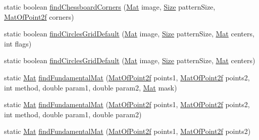 \begin{DoxyCompactItemize}
\item 
static boolean \mbox{\hyperlink{classorg_1_1opencv_1_1calib3d_1_1_calib3d_aa309372b843626fe1d7195ea65bf01ce}{find\+Chessboard\+Corners}} (\mbox{\hyperlink{classorg_1_1opencv_1_1core_1_1_mat}{Mat}} image, \mbox{\hyperlink{classorg_1_1opencv_1_1core_1_1_size}{Size}} pattern\+Size, \mbox{\hyperlink{classorg_1_1opencv_1_1core_1_1_mat_of_point2f}{Mat\+Of\+Point2f}} corners)
\item 
static boolean \mbox{\hyperlink{classorg_1_1opencv_1_1calib3d_1_1_calib3d_a1ca6a42bf6b43db65fc0f231db9d2117}{find\+Circles\+Grid\+Default}} (\mbox{\hyperlink{classorg_1_1opencv_1_1core_1_1_mat}{Mat}} image, \mbox{\hyperlink{classorg_1_1opencv_1_1core_1_1_size}{Size}} pattern\+Size, \mbox{\hyperlink{classorg_1_1opencv_1_1core_1_1_mat}{Mat}} centers, int flags)
\item 
static boolean \mbox{\hyperlink{classorg_1_1opencv_1_1calib3d_1_1_calib3d_a07ab97ed42f8f202715b367a9e31d903}{find\+Circles\+Grid\+Default}} (\mbox{\hyperlink{classorg_1_1opencv_1_1core_1_1_mat}{Mat}} image, \mbox{\hyperlink{classorg_1_1opencv_1_1core_1_1_size}{Size}} pattern\+Size, \mbox{\hyperlink{classorg_1_1opencv_1_1core_1_1_mat}{Mat}} centers)
\item 
static \mbox{\hyperlink{classorg_1_1opencv_1_1core_1_1_mat}{Mat}} \mbox{\hyperlink{classorg_1_1opencv_1_1calib3d_1_1_calib3d_a3dedba28209d17c56b4470b9cce95596}{find\+Fundamental\+Mat}} (\mbox{\hyperlink{classorg_1_1opencv_1_1core_1_1_mat_of_point2f}{Mat\+Of\+Point2f}} points1, \mbox{\hyperlink{classorg_1_1opencv_1_1core_1_1_mat_of_point2f}{Mat\+Of\+Point2f}} points2, int method, double param1, double param2, \mbox{\hyperlink{classorg_1_1opencv_1_1core_1_1_mat}{Mat}} mask)
\item 
static \mbox{\hyperlink{classorg_1_1opencv_1_1core_1_1_mat}{Mat}} \mbox{\hyperlink{classorg_1_1opencv_1_1calib3d_1_1_calib3d_ab758a6250812f65ccec0421d386be1c8}{find\+Fundamental\+Mat}} (\mbox{\hyperlink{classorg_1_1opencv_1_1core_1_1_mat_of_point2f}{Mat\+Of\+Point2f}} points1, \mbox{\hyperlink{classorg_1_1opencv_1_1core_1_1_mat_of_point2f}{Mat\+Of\+Point2f}} points2, int method, double param1, double param2)
\item 
static \mbox{\hyperlink{classorg_1_1opencv_1_1core_1_1_mat}{Mat}} \mbox{\hyperlink{classorg_1_1opencv_1_1calib3d_1_1_calib3d_ae4c04269538cdac95954f77f633c25a6}{find\+Fundamental\+Mat}} (\mbox{\hyperlink{classorg_1_1opencv_1_1core_1_1_mat_of_point2f}{Mat\+Of\+Point2f}} points1, \mbox{\hyperlink{classorg_1_1opencv_1_1core_1_1_mat_of_point2f}{Mat\+Of\+Point2f}} points2)

\end{DoxyCompactItemize}
